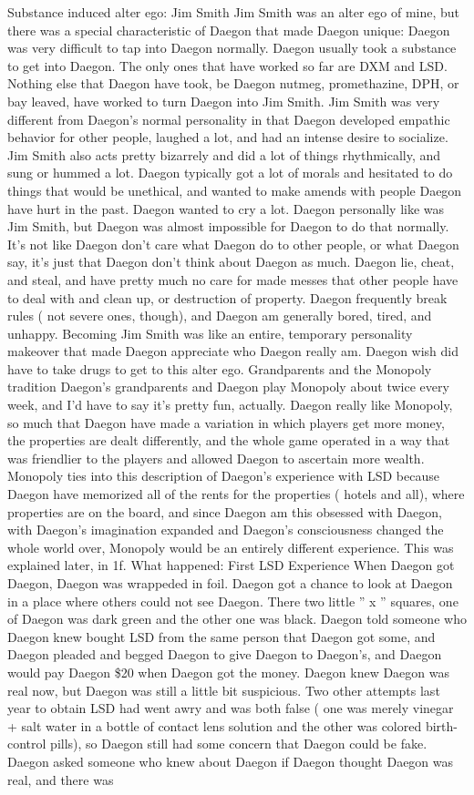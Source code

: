 \documentclass[12pt]{book}
\begin{document}
Substance induced alter ego: Jim Smith Jim Smith was an alter ego of mine, but there was a special characteristic of Daegon that made Daegon unique: Daegon was very difficult to tap into Daegon normally. Daegon usually took a substance to get into Daegon. The only ones that have worked so far are DXM and LSD. Nothing else that Daegon have took, be Daegon nutmeg, promethazine, DPH, or bay leaved, have worked to turn Daegon into Jim Smith. Jim Smith was very different from Daegon's normal personality in that Daegon developed empathic behavior for other people, laughed a lot, and had an intense desire to socialize. Jim Smith also acts pretty bizarrely and did a lot of things rhythmically, and sung or hummed a lot. Daegon typically got a lot of morals and hesitated to do things that would be unethical, and wanted to make amends with people Daegon have hurt in the past. Daegon wanted to cry a lot. Daegon personally like was Jim Smith, but Daegon was almost impossible for Daegon to do that normally. It's not like Daegon don't care what Daegon do to other people, or what Daegon say, it's just that Daegon don't think about Daegon as much. Daegon lie, cheat, and steal, and have pretty much no care for made messes that other people have to deal with and clean up, or destruction of property. Daegon frequently break rules ( not severe ones, though), and Daegon am generally bored, tired, and unhappy. Becoming Jim Smith was like an entire, temporary personality makeover that made Daegon appreciate who Daegon really am. Daegon wish did have to take drugs to get to this alter ego. Grandparents and the Monopoly tradition Daegon's grandparents and Daegon play Monopoly about twice every week, and I'd have to say it's pretty fun, actually. Daegon really like Monopoly, so much that Daegon have made a variation in which players get more money, the properties are dealt differently, and the whole game operated in a way that was friendlier to the players and allowed Daegon to ascertain more wealth. Monopoly ties into this description of Daegon's experience with LSD because Daegon have memorized all of the rents for the properties ( hotels and all), where properties are on the board, and since Daegon am this obsessed with Daegon, with Daegon's imagination expanded and Daegon's consciousness changed the whole world over, Monopoly would be an entirely different experience. This was explained later, in 1f. What happened: First LSD Experience When Daegon got Daegon, Daegon was wrappeded in foil. Daegon got a chance to look at Daegon in a place where others could not see Daegon. There two little '' x '' squares, one of Daegon was dark green and the other one was black. Daegon told someone who Daegon knew bought LSD from the same person that Daegon got some, and Daegon pleaded and begged Daegon to give Daegon to Daegon's, and Daegon would pay Daegon \$20 when Daegon got the money. Daegon knew Daegon was real now, but Daegon was still a little bit suspicious. Two other attempts last year to obtain LSD had went awry and was both false ( one was merely vinegar + salt water in a bottle of contact lens solution and the other was colored birth-control pills), so Daegon still had some concern that Daegon could be fake. Daegon asked someone who knew about Daegon if Daegon thought Daegon was real, and there was 
\end{document}
